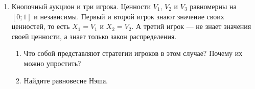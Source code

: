 \begin{enumerate}
\item Кнопочный аукцион и три игрока. Ценности $ V_{1} $, $ V_{2} $ и $ V_{3} $ равномерны на $ [0;1] $ и независимы. Первый и второй игрок знают значение своих ценностей, то есть $ X_{1}=V_{1} $ и $ X_{2}=V_{2} $. А третий игрок — не знает значения своей ценности, а знает только закон распределения. 
\begin{enumerate}
\item Что собой представляют стратегии игроков в этом случае? Почему их можно упростить?
\item Найдите равновесие Нэша.
\end{enumerate}


\end{enumerate}
